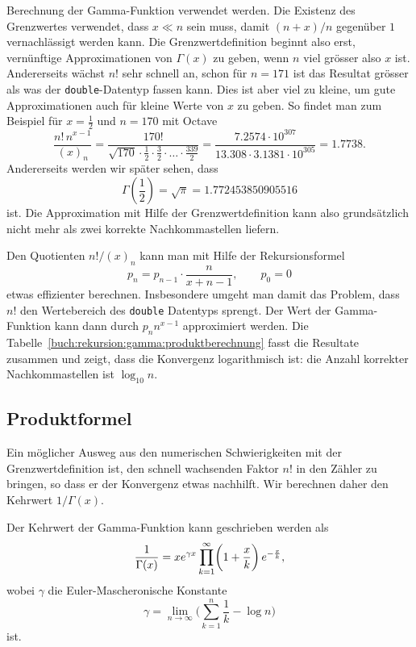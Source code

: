 Berechnung der Gamma-Funktion verwendet werden.
Die Existenz des Grenzwertes verwendet, dass $x\ll n$ sein muss,
damit $(n+x)/n$ gegenüber $1$ vernachlässigt werden kann.
Die Grenzwertdefinition beginnt also erst, vernünftige Approximationen
von $\Gamma(x)$ zu geben, wenn $n$ viel grösser also $x$ ist.
Andererseits wächst $n!$ sehr schnell an, schon für $n=171$ ist
das Resultat grösser als was der \texttt{double}-Datentyp fassen kann.
Dies ist aber viel zu kleine, um gute Approximationen auch für kleine
Werte von $x$ zu geben.
So findet man zum Beispiel für $x=\frac12$ und $n=170$ mit Octave
\[
\frac{n!\,n^{x-1}}{(x)_n}
=
\frac{170!}{\sqrt{170}\cdot \frac12\cdot\frac32\cdot\ldots\cdot\frac{339}{2}}
=
\frac{7.2574\cdot10^{307}}{13.308\cdot 3.1381\cdot10^{305}}
=
1.7738.
\]
Andererseits werden wir später sehen, dass 
\[
\Gamma({\textstyle\frac12})
=
\sqrt{\pi}
=
1.772453850905516
\]
ist.
Die Approximation mit Hilfe der Grenzwertdefinition kann also
grundsätzlich nicht mehr als zwei korrekte Nachkommastellen liefern.

Den Quotienten $n!/(x)_n$ kann man mit Hilfe der Rekursionsformel
\begin{equation}
p_n = p_{n-1}\cdot \frac{n}{x+n-1},\qquad
p_0 = 0
\label{buch:rekursion:gamma:pnfolge}
\end{equation}
etwas effizienter berechnen. 
Insbesondere umgeht man damit das Problem, dass $n!$ den Wertebereich 
des \texttt{double} Datentyps sprengt.
Der Wert der Gamma-Funktion kann dann durch $p_nn^{x-1}$ approximiert
werden.
Die Tabelle~\ref{buch:rekursion:gamma:produktberechnung} fasst die
Resultate zusammen und zeigt, dass die Konvergenz logarithmisch ist:
die Anzahl korrekter Nachkommastellen ist $\log_{10}n$.

%
%
\subsection{Produktformel}
Ein möglicher Ausweg aus den numerischen Schwierigkeiten mit der
Grenzwertdefinition ist, den schnell wachsenden Faktor $n!$
in den Zähler zu bringen, so dass er der Konvergenz etwas nachhilft.
Wir berechnen daher den Kehrwert $1/\Gamma(x)$.

\begin{satz}
%
\label{buch:rekursion:gamma:satz:produktformel}
Der Kehrwert der Gamma-Funktion kann geschrieben werden als
\begin{equation}
\frac{1}{\Gamma(x)}
=
xe^{\gamma x}
\prod_{k=1}^\infty
\biggl(1+\frac{x}k\biggr)\,e^{-\frac{x}{k}},
\label{buch:rekursion:gamma:eqn:produktformel}
\index{Gamma-Funktion!Produktformel}%
\end{equation}
wobei $\gamma$ die Euler-Mascheronische Konstante
%
\[
\gamma
=
\lim_{n\to\infty}
\biggl(\sum_{k=1}^n\frac{1}{k}-\log n\biggr)
\]
ist.
%
%
\end{satz}

